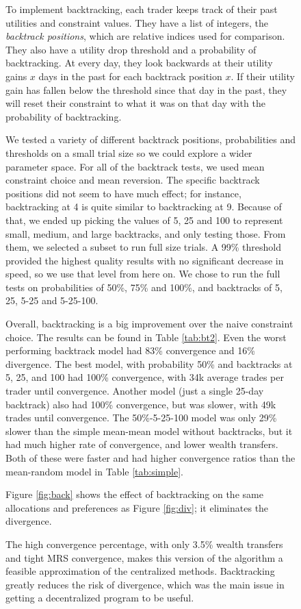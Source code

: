 \documentclass[12pt,a4paper,titlepage]{article}
\newcommand{\co}[1]{\textsf{#1}}
\begin{document}
\begin{figure}[H]
To implement backtracking, each trader keeps track of their past utilities and constraint values.
They have a list of integers, the \textit{backtrack positions}, which are relative indices used for comparison.
They also have a utility drop threshold and a probability of backtracking.
At every day, they look backwards at their utility gains $x$ days in the past for each backtrack position $x$.
If their utility gain has fallen below the threshold since that day in the past, they will reset their constraint to what it was on that day with the probability of backtracking.

We tested a variety of different backtrack positions, probabilities and thresholds on a small trial size so we could explore a wider parameter space.
For all of the backtrack tests, we used \co{mean} constraint choice and \co{mean} reversion.
The specific backtrack positions did not seem to have much effect; for instance, backtracking at 4 is quite similar to backtracking at 9. 
Because of that, we ended up picking the values of 5, 25 and 100 to represent small, medium, and large backtracks, and only testing those.
From them, we selected a subset to run full size trials.
A 99\% threshold provided the highest quality results with no significant decrease in speed, so we use that level from here on.
We chose to run the full tests on probabilities of 50\%, 75\% and 100\%, and backtracks of 5, 25, 5-25 and 5-25-100. 

Overall, backtracking is a big improvement over the naive constraint choice.
The results can be found in Table \ref{tab:bt2}.
Even the worst performing backtrack model had 83\% convergence and 16\% divergence.
The best model, with probability 50\% and backtracks at 5, 25, and 100 had 100\% convergence, with 34k average trades per trader until convergence.
Another model (just a single 25-day backtrack) also had 100\% convergence, but was slower, with 49k trades until convergence.
The 50\%-5-25-100 model was only 29\% slower than the simple \co{mean}-\co{mean} model without backtracks, but it had much higher rate of convergence, and lower wealth transfers.
Both of these were faster and had higher convergence ratios than the \co{mean}-\co{random} model in Table \ref{tab:simple}.


Figure \ref{fig:back} shows the effect of backtracking on the same allocations and preferences as Figure \ref{fig:div}; it eliminates the divergence.

The high convergence percentage, with only 3.5\% wealth transfers and tight MRS convergence, makes this version of the algorithm a feasible approximation of the centralized methods. 
Backtracking greatly reduces the risk of divergence, which was the main issue in getting a decentralized program to be useful.


\end{figure}
\end{document}
